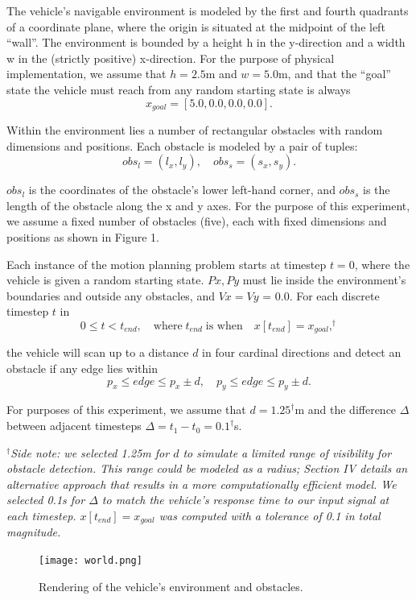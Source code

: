 \documentclass[
	letterpaper, %
	10pt, %
	unnumberedsections, %
	twoside, %
]{LTJournalArticle}
\begin{document}
The vehicle’s navigable environment is modeled by the first and fourth quadrants of a coordinate plane, where the origin is situated at the midpoint of the left “wall”. The environment is bounded by a height h in the y-direction and a width w in the (strictly positive) x-direction. For the purpose of physical implementation, we assume that \(h = 2.5\)m and \(w = 5.0\)m, and that the “goal” state the vehicle must reach from any random starting state is always
\[x_{goal} = [5.0, 0.0, 0.0, 0.0].\]

Within the environment lies a number of rectangular obstacles with random dimensions and positions. Each obstacle is modeled by a pair of tuples:
\[obs_l = (l_x, l_y), \quad obs_s = (s_x, s_y).\]

\(obs_l\) is the coordinates of the obstacle’s lower left-hand corner, and \(obs_s\) is the length of the obstacle along the x and y axes. For the purpose of this experiment, we assume a fixed number of obstacles (five), each with fixed dimensions and positions as shown in Figure 1.

Each instance of the motion planning problem starts at timestep \(t=0\), where the vehicle is given a random starting state. \(Px, Py\) must lie inside the environment’s boundaries and outside any obstacles, and \(Vx = Vy\) = 0.0. For each discrete timestep \(t\) in
\[0 \leq t < t_{end}, \quad \text{where}\; t_{end}\; \text{is when} \quad x[t_{end}] = x_{goal},^\dagger\]

\noindent the vehicle will scan up to a distance \(d\) in four cardinal directions and detect an obstacle if any edge lies within
\[p_x \leq edge \leq p_x \pm d, \quad p_y \leq edge \leq p_y \pm d.\]

For purposes of this experiment, we assume that \(d = 1.25^\dagger\)m and the difference \(\Delta\) between adjacent timesteps \(\Delta = t_1 - t_0 = 0.1^\dagger\)s.

\textit{\(^\dagger\)Side note: we selected 1.25m for \(d\) to simulate a limited range of visibility for obstacle detection. This range could be modeled as a radius; Section IV details an alternative approach that results in a more computationally efficient model. We selected 0.1s for \(\Delta\) to match the vehicle's response time to our input signal at each timestep. \(x[t_{end}] = x_{goal}\) was computed with a tolerance of 0.1 in total magnitude.}

\begin{figure}
	\texttt{[image: world.png]}
	\caption{Rendering of the vehicle's environment and obstacles.}
\end{figure}
\end{document}
